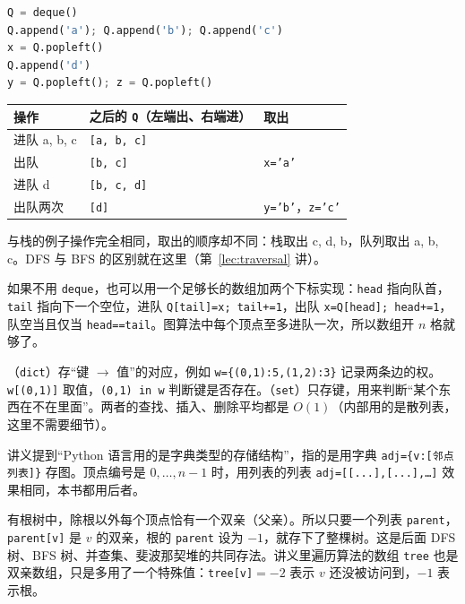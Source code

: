 \begin{example}
\begin{lstlisting}[language=Python,style=frag]
Q = deque()
Q.append('a'); Q.append('b'); Q.append('c')
x = Q.popleft()
Q.append('d')
y = Q.popleft(); z = Q.popleft()
\end{lstlisting}
\begin{center}
\begin{tabular}{lll}
\toprule
操作 & 之后的 \texttt{Q}（左端出、右端进） & 取出 \\
\midrule
进队 a, b, c & \texttt{[a, b, c]} & \\
出队 & \texttt{[b, c]} & \texttt{x='a'} \\
进队 d & \texttt{[b, c, d]} & \\
出队两次 & \texttt{[d]} & \texttt{y='b'}，\texttt{z='c'} \\
\bottomrule
\end{tabular}
\end{center}
与栈的例子操作完全相同，取出的顺序却不同：栈取出 c, d, b，队列取出 a, b, c。DFS 与 BFS 的区别就在这里（第~\ref{lec:traversal} 讲）。
\end{example}

如果不用 \texttt{deque}，也可以用一个足够长的数组加两个下标实现：\texttt{head} 指向队首，\texttt{tail} 指向下一个空位，进队 \texttt{Q[tail]=x; tail+=1}，出队 \texttt{x=Q[head]; head+=1}，队空当且仅当 \texttt{head==tail}。图算法中每个顶点至多进队一次，所以数组开 $n$ 格就够了。


（\texttt{dict}）存“键 $\to$ 值”的对应，例如 \texttt{w=\{(0,1):5,(1,2):3\}} 记录两条边的权。\texttt{w[(0,1)]} 取值，\texttt{(0,1) in w} 判断键是否存在。（\texttt{set}）只存键，用来判断“某个东西在不在里面”。两者的查找、插入、删除平均都是 $O(1)$（内部用的是散列表，这里不需要细节）。

讲义提到“Python 语言用的是字典类型的存储结构”，指的是用字典 \texttt{adj=\{v:[邻点列表]\}} 存图。顶点编号是 $0,\dots,n-1$ 时，用列表的列表 \texttt{adj=[[...],[...],\dots]} 效果相同，本书都用后者。


有根树中，除根以外每个顶点恰有一个双亲（父亲）。所以只要一个列表 \texttt{parent}，\texttt{parent[v]} 是 $v$ 的双亲，根的 \texttt{parent} 设为 $-1$，就存下了整棵树。这是后面 DFS 树、BFS 树、并查集、斐波那契堆的共同存法。讲义里遍历算法的数组 \texttt{tree} 也是双亲数组，只是多用了一个特殊值：\texttt{tree[v]}$=-2$ 表示 $v$ 还没被访问到，$-1$ 表示根。

